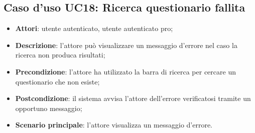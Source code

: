 \newpage
\subsection{Caso d'uso UC18: Ricerca questionario fallita}
\label{UC18}
\begin{itemize}
\item\textbf{Attori}: utente autenticato, utente autenticato pro;
\item\textbf{Descrizione}: l'attore può visualizzare un messaggio d'errore nel caso la ricerca non produca risultati;
\item\textbf{Precondizione}: l'attore ha utilizzato la barra di ricerca per cercare un questionario che non esiste;
\item\textbf{Postcondizione}: il sistema avvisa l'attore dell'errore verificatosi tramite un opportuno messaggio;
\item\textbf{Scenario principale}: l'attore visualizza un messaggio d'errore.
\end{itemize}